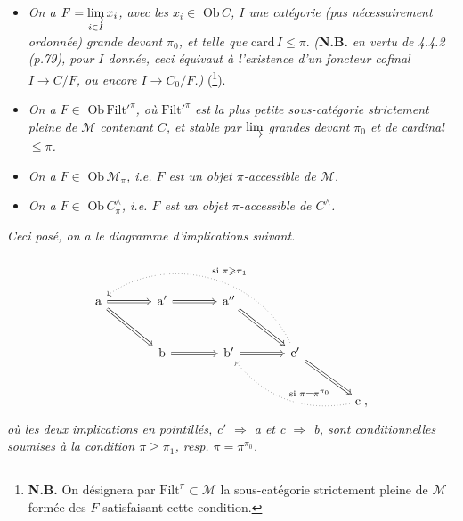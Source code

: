 \documentclass[11pt]{article}
\newcommand{\printedpage}[1]{\marginpar{\footnotesize p.~#1}}
\newcommand{\msp}[1]{\marginpar{\footnotesize [#1]}}
\newcommand{\Mc}{\mathcal{M}}
\begin{document}
\printedpage{53}
\msp{page 162}

\begin{itemize}[leftmargin=4em]
\item[\textit{b)}] \textit{On a $F = \varinjlim\limits_{i \in I} x_i$, avec les $x_i \in$} $\mathrm{Ob}\, C$\textit{, $I$ une catégorie (pas nécessairement ordonnée) grande devant $\pi_0$, et telle que} $\mathrm{card}\, I \leqslant \pi$. \textit{(}\textbf{N.B.} \textit{en vertu de 4.4.2 (p.79), pour $I$ donnée, ceci équivaut à l'existence d'un foncteur cofinal $I \longrightarrow C/F$, ou encore $I \longrightarrow C_0/F$.)} (\footnote[66]{\textbf{N.B.} On désignera par $\mathrm{Filt}^{\pi} \subset \Mc$ la sous-catégorie strictement pleine de $\Mc$ formée des $F$ satisfaisant cette condition.}).
\item[\textit{b$'$)}] \textit{On a $F \in$} $\mathrm{Ob}\,\mathrm{Filt}'^{\pi}$\textit{, où} $\mathrm{Filt}'^{\pi}$ \textit{est la plus petite sous-catégorie strictement pleine de $\Mc$ contenant $C$, et stable par $\varinjlim$ grandes devant $\pi_0$ et de cardinal $\leqslant \pi$.}
\item[\textit{c)}] \textit{On a $F \in$} $\mathrm{Ob}\,\Mc_{\pi}$\textit{, i.e. $F$ est un objet $\pi$-accessible de $\Mc$.}
\item[\textit{c$'$)}] \textit{On a $F \in$} $\mathrm{Ob}\, C^{\wedge}_{\pi}$\textit{, i.e. $F$ est un objet $\pi$-accessible de $C^{\wedge}$.}
\end{itemize}
\textit{Ceci posé, on a le diagramme d'implications suivant.}
\[
\begin{tikzcd}[column sep=large, row sep=large]
\mathrm{a} \arrow[r, Rightarrow] \arrow[dr, Rightarrow] & \mathrm{a}' \arrow[r, Rightarrow] & \mathrm{a}'' \arrow[dr, Rightarrow] & & \\
& \mathrm{b} \arrow[r, Rightarrow] & \mathrm{b}' \arrow[r, Rightarrow] & \mathrm{c}' \arrow[dr, Rightarrow] \arrow[ulll, dotted, bend right=50, "\text{si } \pi \geqslant \pi_1"'] & \\
& & & & \mathrm{c}\;, \arrow[ull, dotted, bend left=30, "\text{si } \pi = \pi^{\pi_0}"']
\end{tikzcd}
\]
\textit{où les deux implications en pointillés, c$'$ $\Longrightarrow$ a et c $\Longrightarrow$ b, sont conditionnelles soumises à la condition $\pi \geqslant \pi_1$, resp. $\pi = \pi^{\pi_0}$.}

\msp{page 163}
\end{document}
